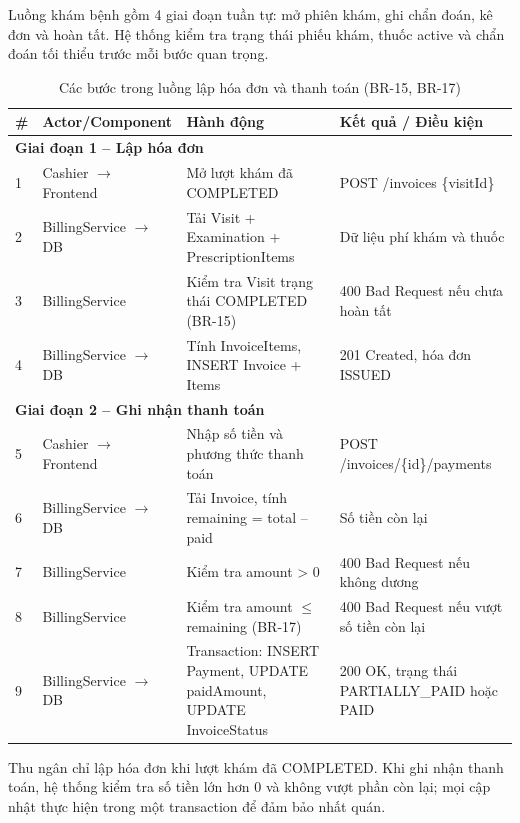 Luồng khám bệnh gồm 4 giai đoạn tuần tự: mở phiên khám, ghi chẩn đoán, kê đơn và hoàn tất. Hệ thống kiểm tra trạng thái phiếu khám, thuốc active và chẩn đoán tối thiểu trước mỗi bước quan trọng.

\begin{longtable}{|p{0.5cm}|p{3.2cm}|p{5.5cm}|p{4.6cm}|}
\caption{Các bước trong luồng lập hóa đơn và thanh toán (BR-15, BR-17)}\label{tab:payment-sequence}\\
\hline
\textbf{\#} & \textbf{Actor/Component} & \textbf{Hành động} & \textbf{Kết quả / Điều kiện} \\
\hline
\multicolumn{4}{|l|}{\textbf{Giai đoạn 1 -- Lập hóa đơn}} \\
\hline
1 & Cashier $\rightarrow$ Frontend & Mở lượt khám đã COMPLETED & POST /invoices \{visitId\} \\
\hline
2 & BillingService $\rightarrow$ DB & Tải Visit + Examination + PrescriptionItems & Dữ liệu phí khám và thuốc \\
\hline
3 & BillingService & Kiểm tra Visit trạng thái COMPLETED (BR-15) & 400 Bad Request nếu chưa hoàn tất \\
\hline
4 & BillingService $\rightarrow$ DB & Tính InvoiceItems, INSERT Invoice + Items & 201 Created, hóa đơn ISSUED \\
\hline
\multicolumn{4}{|l|}{\textbf{Giai đoạn 2 -- Ghi nhận thanh toán}} \\
\hline
5 & Cashier $\rightarrow$ Frontend & Nhập số tiền và phương thức thanh toán & POST /invoices/\{id\}/payments \\
\hline
6 & BillingService $\rightarrow$ DB & Tải Invoice, tính remaining = total -- paid & Số tiền còn lại \\
\hline
7 & BillingService & Kiểm tra amount > 0 & 400 Bad Request nếu không dương \\
\hline
8 & BillingService & Kiểm tra amount $\leq$ remaining (BR-17) & 400 Bad Request nếu vượt số tiền còn lại \\
\hline
9 & BillingService $\rightarrow$ DB & Transaction: INSERT Payment, UPDATE paidAmount, UPDATE InvoiceStatus & 200 OK, trạng thái PARTIALLY\_PAID hoặc PAID \\
\hline
\end{longtable}

Thu ngân chỉ lập hóa đơn khi lượt khám đã COMPLETED. Khi ghi nhận thanh toán, hệ thống kiểm tra số tiền lớn hơn 0 và không vượt phần còn lại; mọi cập nhật thực hiện trong một transaction để đảm bảo nhất quán.

